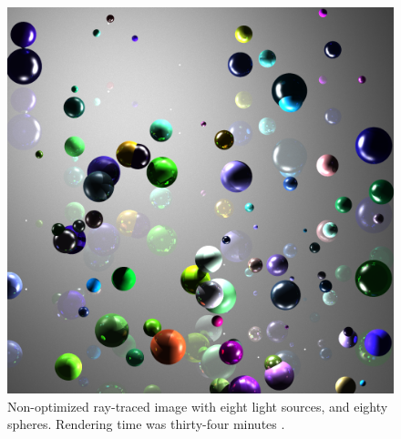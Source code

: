 \begin{figure}[H]
\begin{center}
\includegraphics[scale=0.25]{result1.png} 
\caption{Non-optimized ray-traced image with eight light sources, and eighty spheres.  Rendering time was thirty-four minutes .}
\label{result1}
\end{center}
\end{figure}

